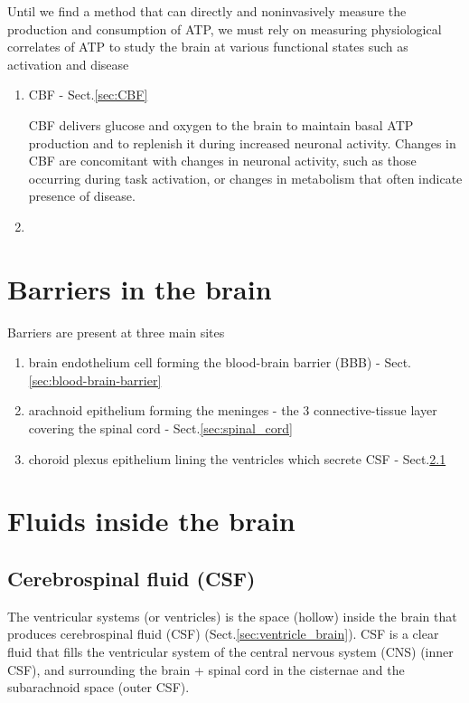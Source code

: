 Until we find a method that can directly and noninvasively measure the
production and consumption of ATP, we must rely on measuring physiological
correlates of ATP to study the brain at various functional states such as
activation and disease
\begin{enumerate}
  \item CBF - Sect.\ref{sec:CBF}

CBF delivers glucose and oxygen to the brain to maintain basal ATP production
and to replenish it during increased neuronal activity.
Changes in CBF are concomitant with changes in neuronal activity, such as those
occurring during task activation, or changes in metabolism that often indicate
presence of disease.

  \item
\end{enumerate}


\section{Barriers in the brain}

Barriers are present at three main sites
\begin{enumerate}
  \item brain endothelium cell forming the blood-brain barrier (BBB) -
  Sect.\ref{sec:blood-brain-barrier}

  \item arachnoid epithelium forming the meninges - the 3 connective-tissue
  layer covering the spinal cord - Sect.\ref{sec:spinal_cord}

  \item choroid plexus epithelium lining the ventricles which secrete CSF -
  Sect.\ref{sec:CSF}
\end{enumerate}

\section{Fluids inside the brain}

\subsection{Cerebrospinal fluid (CSF)}
\label{sec:CSF}


The ventricular systems (or ventricles) is the space (hollow) inside the brain
that produces cerebrospinal fluid (CSF) (Sect.\ref{sec:ventricle_brain}).
CSF is a clear fluid that fills the ventricular system of the central nervous
system (CNS) (inner CSF), and surrounding the brain + spinal cord in the
cisternae and the subarachnoid space (outer CSF).

